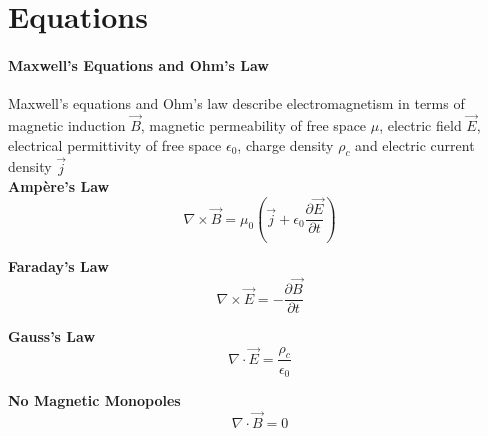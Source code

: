 \appendix
\appendixpage
\addappheadtotoc
%





\section{Equations}\label{mhdeqns}
\paragraph{Maxwell's Equations and Ohm's Law}
Maxwell's equations and Ohm's law describe electromagnetism in terms of magnetic induction $\vec{B}$, magnetic permeability of free space $\mu$, electric field $\vec{E}$, electrical permittivity of free space $\epsilon_{0}$, charge density $\rho_{c}$ and electric current density $\vec{j}$ \\ 

\textbf{Ampère's Law}
\begin{equation}\label{max1:ampere}
\nabla\times\vec{B}=\mu_{0}(\vec{j}+\epsilon_{0}\frac{\partial \vec{E}}{\partial t})
\end{equation}

\textbf{Faraday's Law}
\begin{equation}\label{max2:faraday}
\nabla\times\vec{E}=-\frac{\partial \vec{B}}{\partial t}
\end{equation}

\textbf{Gauss's Law}
\begin{equation}\label{max3:gauss}
\nabla\cdot\vec{E}=\frac{\rho_{c}}{\epsilon_{0}}
\end{equation}

\textbf{No Magnetic Monopoles}
\begin{equation}\label{max4:nomonopole}
\nabla\cdot\vec{B}=0
\end{equation}

